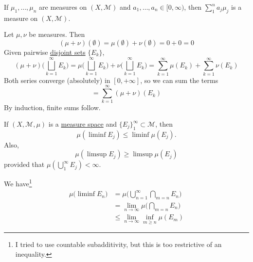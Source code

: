 	\begin{exercise}[Folland 1.7]
		If $\mu_1, \dots, \mu_n$ are measures on $(X, \mathcal{M})$ and $a_1, \dots, a_n \in [0, \infty)$, then $\sum_1^n a_j \mu_j$ is a measure on $(X, \mathcal{M})$.
	\end{exercise}
	\begin{solution}
		Let $\mu, \nu$ be measures. Then 
		\begin{equation}
			(\mu + \nu)(\emptyset) = \mu(\emptyset) + \nu(\emptyset) = 0 + 0 = 0
		\end{equation}
		Given pairwise \hyperref[st-def:disjoint-sets]{disjoint sets} $\{E_k\}$, 
		\begin{equation}
			(\mu + \nu) \bigg( \bigsqcup_{k=1}^\infty E_k \bigg) = \mu \bigg( \bigsqcup_{k=1}^\infty E_k \bigg) + \nu \bigg( \bigsqcup_{k=1}^\infty E_k \bigg) = \sum_{k=1}^\infty \mu(E_k) + \sum_{k=1}^\infty \nu(E_k)
		\end{equation}
		Both series converge (absolutely) in $[0, +\infty]$, so we can sum the terms 
		\begin{equation}
			= \sum_{k=1}^\infty (\mu + \nu)(E_k)
		\end{equation}
		By induction, finite sums follow. 
	\end{solution}

	\begin{exercise}[Folland 1.8]
		If $(X, \mathcal{M}, \mu)$ is a \hyperref[def:measure-space]{measure space} and $\{E_j\}_1^\infty \subset \mathcal{M}$, then 
		\begin{equation}
			\mu(\liminf E_j) \le \liminf \mu(E_j).
		\end{equation}
		Also, 
		\begin{equation}
			\mu(\limsup E_j) \ge \limsup \mu(E_j)
		\end{equation}
		provided that $\mu(\bigcup_1^\infty E_j) < \infty$.
	\end{exercise}
	\begin{solution}
		We have\footnote{I tried to use countable subadditivity, but this is too restrictive of an inequality.}
		\begin{align}
			\mu \big( \liminf E_n \big) & = \mu \bigg( \bigcup_{n=1}^\infty \bigcap_{m=n}E_n \bigg) \\ 
																	& = \lim_{n \to \infty} \mu \bigg( \bigcap_{m=n} E_n \bigg) \\ 
																	& \leq \lim_{n \to \infty} \inf_{m \geq n} \mu(E_m) 
		\end{align}
	\end{solution}


